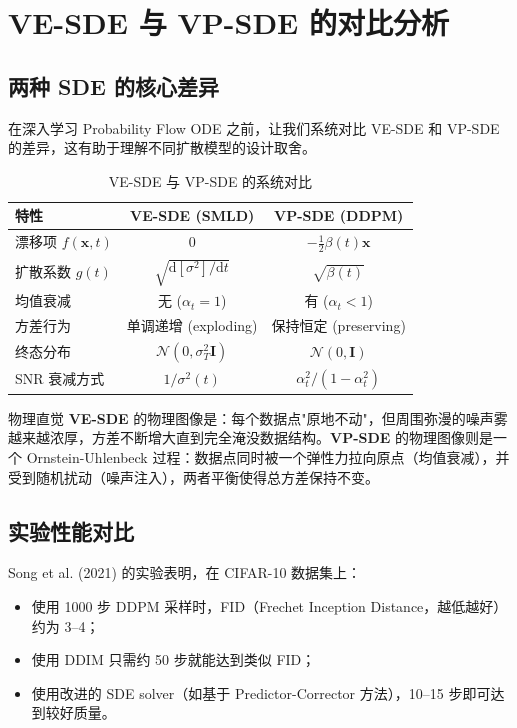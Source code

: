 \section{VE-SDE 与 VP-SDE 的对比分析}

\subsection{两种 SDE 的核心差异}

在深入学习 Probability Flow ODE 之前，让我们系统对比 VE-SDE 和 VP-SDE 的差异，这有助于理解不同扩散模型的设计取舍。

\begin{table}[H]
\centering
\begin{tabular}{lcc}
\toprule
\textbf{特性} & \textbf{VE-SDE (SMLD)} & \textbf{VP-SDE (DDPM)} \\
\midrule
漂移项 $f(\mathbf{x},t)$ & $0$ & $-\frac{1}{2}\beta(t)\mathbf{x}$ \\
扩散系数 $g(t)$ & $\sqrt{\mathrm{d}[\sigma^2]/\mathrm{d}t}$ & $\sqrt{\beta(t)}$ \\
均值衰减 & 无 ($\alpha_t = 1$) & 有 ($\alpha_t < 1$) \\
方差行为 & 单调递增 (exploding) & 保持恒定 (preserving) \\
终态分布 & $\mathcal{N}(0, \sigma_T^2 \mathbf{I})$ & $\mathcal{N}(0, \mathbf{I})$ \\
SNR 衰减方式 & $1/\sigma^2(t)$ & $\alpha_t^2/(1-\alpha_t^2)$ \\
\bottomrule
\end{tabular}
\caption{VE-SDE 与 VP-SDE 的系统对比}
\end{table}

\begin{knowledgebox}{物理直觉}
\textbf{VE-SDE} 的物理图像是：每个数据点"原地不动"，但周围弥漫的噪声雾越来越浓厚，方差不断增大直到完全淹没数据结构。\textbf{VP-SDE} 的物理图像则是一个 Ornstein-Uhlenbeck 过程：数据点同时被一个弹性力拉向原点（均值衰减），并受到随机扰动（噪声注入），两者平衡使得总方差保持不变。
\end{knowledgebox}

\subsection{实验性能对比}

Song et al. (2021) 的实验表明，在 CIFAR-10 数据集上：
\begin{itemize}
    \item 使用 1000 步 DDPM 采样时，FID（Frechet Inception Distance，越低越好）约为 3--4；
    \item 使用 DDIM 只需约 50 步就能达到类似 FID；
    \item 使用改进的 SDE solver（如基于 Predictor-Corrector 方法），10--15 步即可达到较好质量。
\end{itemize}

